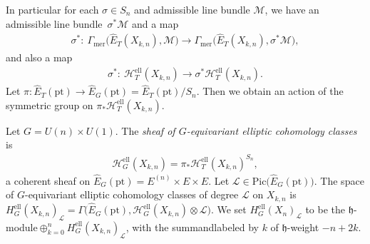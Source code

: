 \documentclass[pdftex]{sigma}
\numberwithin{equation}{section}
\begin{document}
In particular for each $\sigma\in S_n$ and admissible line bundle $\mathcal M$, we have an admissible line bundle~$\sigma^*\mathcal M$ and a map
\begin{gather*} \sigma^*\colon \ \Gamma_{\mathrm{mer}}\big(\hat E_T(X_{k,n}),\mathcal M\big)\to \Gamma_{\mathrm{mer}}\big(\hat E_T(X_{k,n}),\sigma^*\mathcal M\big),
\end{gather*}
and also a map
\begin{gather*}
 \sigma^*\colon \ \mathcal H^{\mathrm{ell}}_T(X_{k,n})\to \sigma^*\mathcal H^{\mathrm{ell}}_T(X_{k,n}).
\end{gather*}
Let $\pi\colon \hat E_T(\mathrm{pt})\to \hat E_G(\mathrm{pt})=\hat E_T(\mathrm{pt})/S_n$. Then we obtain an action of the symmetric group on $\pi_*\mathcal H^{\mathrm{ell}}_T(X_{k,n})$.
\begin{Definition}\label{def-G-equiv} Let $G=U(n)\times U(1)$. The {\em sheaf of $G$-equivariant elliptic cohomology classes} is
 \begin{gather*}
 \mathcal H^{\mathrm{ell}}_G(X_{k,n})=\pi_*\mathcal H^{\mathrm{ell}}_T(X_{k,n})^{S_n},
 \end{gather*}
a coherent sheaf on $\hat E_G(\mathrm{pt})=E^{(n)}\times E\times E$. Let $\mathcal L\in\mathrm{Pic}\big(\hat E_G(\mathrm{pt})\big)$. The space of $G$-equivariant elliptic cohomology classes of degree $\mathcal L$ on $X_{k,n}$ is $H^{\mathrm{ell}}_G(X_{k,n})_{\mathcal L}=\Gamma\big(\hat E_G(\mathrm{pt}),\mathcal H_G^{\mathrm{ell}}(X_{k,n})\otimes\mathcal L\big)$. We set $H^{\mathrm{ell}}_G(X_n)_{\mathcal L}$ to be the $\mathfrak h$-module$\oplus_{k=0}^n H^{\mathrm{ell}}_G(X_{k,n})_{\mathcal L}$, with the summandlabeled by $k$ of $\mathfrak h$-weight $-n+2k$.
\end{Definition}
\end{document}
